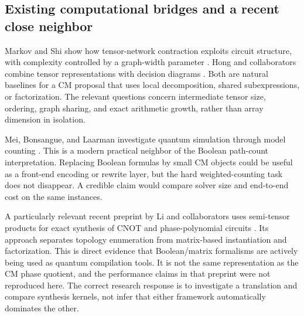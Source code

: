 \subsection{Existing computational bridges and a recent close neighbor}
Markov and Shi show how tensor-network contraction exploits circuit structure, with complexity controlled by a graph-width parameter \cite{markov}. Hong and collaborators combine tensor representations with decision diagrams \cite{tdd}. Both are natural baselines for a CM proposal that uses local decomposition, shared subexpressions, or factorization. The relevant questions concern intermediate tensor size, ordering, graph sharing, and exact arithmetic growth, rather than array dimension in isolation.

Mei, Bonsangue, and Laarman investigate quantum simulation through model counting \cite{mei}. This is a modern practical neighbor of the Boolean path-count interpretation. Replacing Boolean formulas by small CM objects could be useful as a front-end encoding or rewrite layer, but the hard weighted-counting task does not disappear. A credible claim would compare solver size and end-to-end cost on the same instances.

A particularly relevant recent preprint by Li and collaborators uses semi-tensor products for exact synthesis of CNOT and phase-polynomial circuits \cite{stp2026}. Its approach separates topology enumeration from matrix-based instantiation and factorization. This is direct evidence that Boolean/matrix formalisms are actively being used as quantum compilation tools. It is not the same representation as the CM phase quotient, and the performance claims in that preprint were not reproduced here. The correct research response is to investigate a translation and compare synthesis kernels, not infer that either framework automatically dominates the other.

